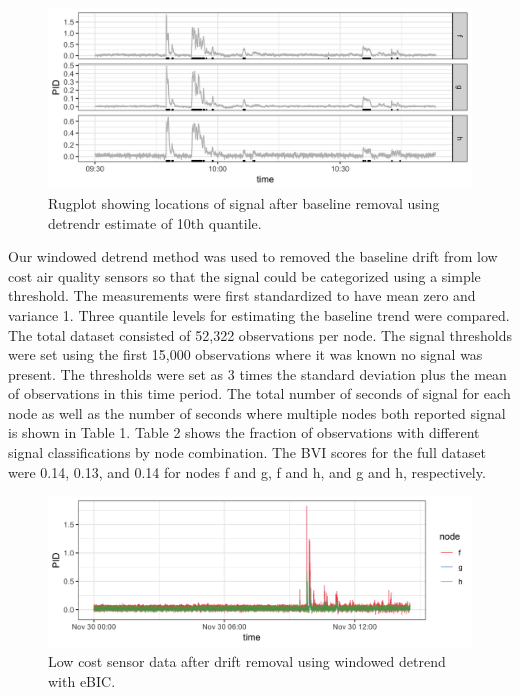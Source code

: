 \documentclass[12pt]{article}
\begin{document}
	
	\begin{figure}
		\caption{Rugplot showing locations of signal after baseline removal using detrendr estimate of 10th quantile.}
		\includegraphics[width = \linewidth]{Figures/corrected_rugplot.png}
	\end{figure}

	
	Our windowed detrend method was used to removed the baseline drift from low cost air quality sensors so that the signal could be categorized using a simple threshold. The measurements were first standardized to have mean zero and variance 1. Three quantile levels for estimating the baseline trend were compared. The total dataset consisted of 52,322 observations per node. 
	The signal thresholds were set using the first 15,000 observations where it was known no signal was present. The thresholds were set as 3 times the standard deviation plus the mean of observations in this time period. The total number of seconds of signal for each node as well as the number of seconds where multiple nodes both reported signal is shown in Table 1. Table 2 shows the fraction of observations with different signal classifications by node combination. The BVI scores for the full dataset were 0.14, 0.13, and 0.14 for nodes f and g, f and h, and g and h, respectively. 
		
	\begin{figure}
		\caption{Low cost sensor data after drift removal using windowed detrend with eBIC.}
		\includegraphics[width = \linewidth]{Figures/corrected_data.png}
	\end{figure}
\end{document}
